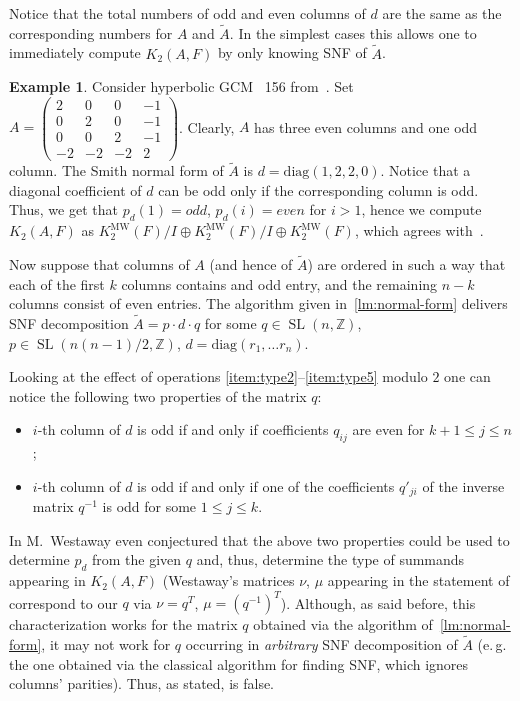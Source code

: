 \documentclass[oneside, 10pt]{amsart}
\theoremstyle{plain}
\theoremstyle{remark}
\theoremstyle{definition}
\newtheorem{example}{Example} \Crefname{example}{Example}{Examples}
\DeclareMathOperator{\SL}{SL}
\newcommand{\ZZ}{\mathbb{Z}}
\newcommand{\K}{K_2}
\newcommand{\Kmw}{K^{\mathrm{MW}}_2}
\begin{document}
Notice that the total numbers of odd and even columns of $d$ are the same as the corresponding numbers for $A$ and $\widetilde{A}$.
In the simplest cases this allows one to immediately compute $\K(A, F)$ by only knowing SNF of $\widetilde{A}$.
\begin{example}
Consider hyperbolic GCM \textnumero~156 from~\cite[p.~19]{MW}.
 Set $A = \left(\begin{smallmatrix}
 2& 0& 0& -1\\
 0& 2& 0& -1\\
 0& 0& 2& -1\\
 -2& -2& -2& 2\end{smallmatrix}\right)$.
Clearly, $A$ has three even columns and one odd column. 
The Smith normal form of $\widetilde{A}$ is $d=\mathrm{diag}(1,2,2,0)$.
Notice that a diagonal coefficient of $d$ can be odd only if the corresponding column is odd.
Thus, we get that $p_d(1)=odd$, $p_d(i)=even$ for $i>1$, hence we compute $\K(A, F)$ as $\Kmw(F)/I \oplus \Kmw(F)/I \oplus \Kmw(F)$,
 which agrees with~\cite{MW}.
\end{example}
  
Now suppose that columns of $A$ (and hence of $\widetilde{A}$) are ordered in such a way that
 each of the first $k$ columns contains and odd entry, and the remaining $n-k$ columns consist of even entries.
The algorithm given in~\cref{lm:normal-form} delivers SNF decomposition
 $\widetilde{A} = p \cdot d \cdot q $ for some $q \in \SL(n, \ZZ)$, $p \in \SL(n(n-1)/2, \ZZ)$, $d = \mathrm{diag}(r_1, \ldots r_n)$.

Looking at the effect of operations \eqref{item:type2}--\eqref{item:type5} modulo $2$ one can notice the following two properties of the matrix $q$:
\begin{itemize}
 \item $i$-th column of $d$ is odd if and only if coefficients $q_{ij}$ are even for $k+1\leq j \leq n$;
 \item $i$-th column of $d$ is odd if and only if one of the coefficients $q'_{ji}$ of the inverse matrix $q^{-1}$ is odd for some $1\leq j\leq k$.
\end{itemize}

In \cite{MW} M.~Westaway even conjectured that the above two properties could be used to determine $p_d$ from the given $q$ and,
 thus, determine the type of summands appearing in $\K(A, F)$
 (Westaway's matrices $\nu$, $\mu$ appearing in the statement of \cite[Conjecture~9.1]{MW} correspond to our $q$ via $\nu = q^T$, $\mu = (q^{-1})^T$).
Although, as said before, this characterization works for the matrix $q$ obtained via the algorithm of~\cref{lm:normal-form},
 it may not work for $q$ occurring in {\it arbitrary} SNF decomposition of $\widetilde{A}$
 (e.\,g. the one obtained via the classical algorithm for finding SNF, which ignores columns' parities).
Thus, as stated, \cite[Conjecture~9.1]{MW} is false.
\end{document}
